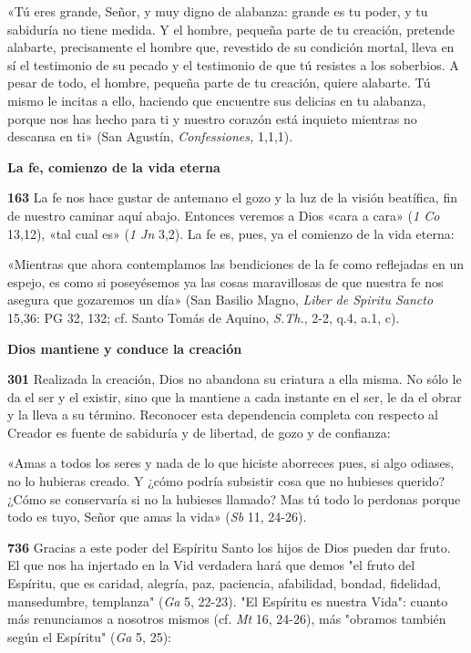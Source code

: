 \documentclass[]{article}
\begin{document}
«Tú eres grande, Señor, y muy digno de alabanza: grande es tu poder, y
tu sabiduría no tiene medida. Y el hombre, pequeña parte de tu creación,
pretende alabarte, precisamente el hombre que, revestido de su condición
mortal, lleva en sí el testimonio de su pecado y el testimonio de que tú
resistes a los soberbios. A pesar de todo, el hombre, pequeña parte de
tu creación, quiere alabarte. Tú mismo le incitas a ello, haciendo que
encuentre sus delicias en tu alabanza, porque nos has hecho para ti y
nuestro corazón está inquieto mientras no descansa en ti» (San Agustín,
\emph{Confessiones,} 1,1,1).

\textbf{La fe, comienzo de la vida eterna}

\textbf{163} La fe nos hace gustar de antemano el gozo y la luz de la
visión beatífica, fin de nuestro caminar aquí abajo. Entonces veremos a
Dios «cara a cara» (\emph{1 Co} 13,12), «tal cual es» (\emph{1 Jn} 3,2).
La fe es, pues, ya el comienzo de la vida eterna:

«Mientras que ahora contemplamos las bendiciones de la fe como
reflejadas en un espejo, es como si poseyésemos ya las cosas
maravillosas de que nuestra fe nos asegura que gozaremos un día» (San
Basilio Magno, \emph{Liber de Spiritu Sancto} 15,36: PG 32, 132; cf.
Santo Tomás de Aquino, \emph{S.Th.}, 2-2, q.4, a.1, c).

\textbf{Dios mantiene y conduce la creación}

\textbf{301} Realizada la creación, Dios no abandona su criatura a ella
misma. No sólo le da el ser y el existir, sino que la mantiene a cada
instante en el ser, le da el obrar y la lleva a su término. Reconocer
esta dependencia completa con respecto al Creador es fuente de sabiduría
y de libertad, de gozo y de confianza:

«Amas a todos los seres y nada de lo que hiciste aborreces pues, si algo
odiases, no lo hubieras creado. Y ¿cómo podría subsistir cosa que no
hubieses querido? ¿Cómo se conservaría si no la hubieses llamado? Mas tú
todo lo perdonas porque todo es tuyo, Señor que amas la vida» (\emph{Sb}
11, 24-26).

\textbf{736} Gracias a este poder del Espíritu Santo los hijos de Dios
pueden dar fruto. El que nos ha injertado en la Vid verdadera hará que
demos "el fruto del Espíritu, que es caridad, alegría, paz, paciencia,
afabilidad, bondad, fidelidad, mansedumbre, templanza" (\emph{Ga} 5,
22-23). "El Espíritu es nuestra Vida": cuanto más renunciamos a nosotros
mismos (cf. \emph{Mt} 16, 24-26), más "obramos también según el
Espíritu" (\emph{Ga} 5, 25):
\end{document}
